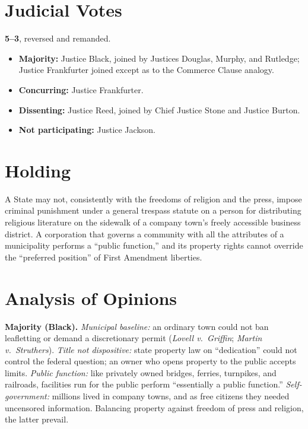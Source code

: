 \documentclass[12pt]{article}
\begin{document}
\section{Judicial Votes}

\textbf{5--3}, reversed and remanded.
\begin{itemize}
\item \textbf{Majority:} Justice Black, joined by Justices Douglas, Murphy, and Rutledge; Justice Frankfurter joined except as to the Commerce Clause analogy.
\item \textbf{Concurring:} Justice Frankfurter.
\item \textbf{Dissenting:} Justice Reed, joined by Chief Justice Stone and Justice Burton.
\item \textbf{Not participating:} Justice Jackson.
\end{itemize}

\section{Holding}

A State may not, consistently with the freedoms of religion and the press, impose criminal punishment under a general trespass statute on a person for distributing religious literature on the sidewalk of a company town's freely accessible business district. A corporation that governs a community with all the attributes of a municipality performs a ``public function,'' and its property rights cannot override the ``preferred position'' of First Amendment liberties.

\section{Analysis of Opinions}

\textbf{Majority (Black).} \textit{Municipal baseline:} an ordinary town could not ban leafletting or demand a discretionary permit (\textit{Lovell v.\ Griffin}; \textit{Martin v.\ Struthers}). \textit{Title not dispositive:} state property law on ``dedication'' could not control the federal question; an owner who opens property to the public accepts limits. \textit{Public function:} like privately owned bridges, ferries, turnpikes, and railroads, facilities run for the public perform ``essentially a public function.'' \textit{Self-government:} millions lived in company towns, and as free citizens they needed uncensored information. Balancing property against freedom of press and religion, the latter prevail.
\end{document}
